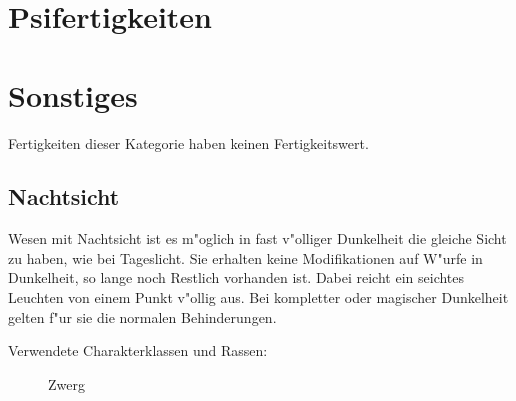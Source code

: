 \section{Psifertigkeiten}

\section{Sonstiges}
\par Fertigkeiten dieser Kategorie haben keinen Fertigkeitswert.

\subsection{Nachtsicht}
\par Wesen mit Nachtsicht ist es m"oglich in fast v"olliger Dunkelheit die gleiche Sicht zu haben, wie bei Tageslicht. Sie erhalten keine Modifikationen auf W"urfe in Dunkelheit, so lange noch Restlich vorhanden ist. Dabei reicht ein seichtes Leuchten von einem Punkt v"ollig aus. Bei kompletter oder magischer Dunkelheit gelten f"ur sie die normalen Behinderungen.
\begin{description}
\item [Verwendete Charakterklassen und Rassen:] Zwerg
\end{description}